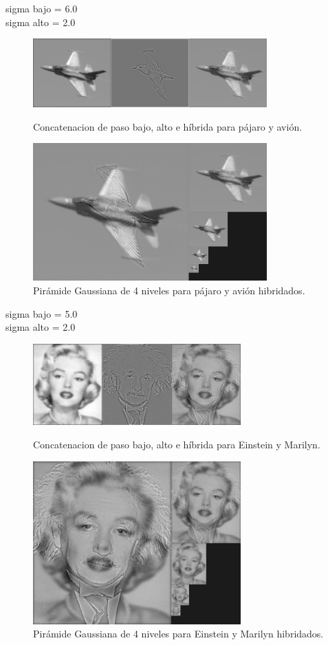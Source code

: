 \documentclass[12pt]{article}
\begin{document}
sigma bajo = 6.0\\
sigma alto = 2.0
\begin{figure}[H]
\centering
\parbox{9cm}{
\includegraphics[width=9cm]{images/ImagenPA.png}
\caption{Concatenacion de paso bajo, alto e híbrida para pájaro y avión.}
\label{fig:2figsA}}
\begin{minipage}{9cm}
\includegraphics[width=9cm]{images/PirPA.png}
\caption{Pirámide Gaussiana de 4 niveles para pájaro y avión hibridados.}
\label{fig:2figsB}
\end{minipage}
\end{figure}

sigma bajo = 5.0\\
sigma alto = 2.0
\begin{figure}[H]
\centering
\parbox{8cm}{
\includegraphics[width=8cm]{images/ImagenEM.png}
\caption{Concatenacion de paso bajo, alto e híbrida para Einstein y Marilyn.}
\label{fig:2figsA}}
\begin{minipage}{8cm}
\includegraphics[width=8cm]{images/PirEM.png}
\caption{Pirámide Gaussiana de 4 niveles para Einstein y Marilyn hibridados.}
\label{fig:2figsB}
\end{minipage}
\end{figure}
\end{document}
